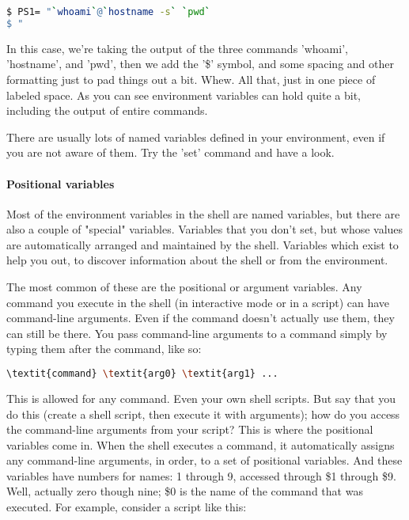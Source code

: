 \lstset{basicstyle=\scriptsize, numbers=left, captionpos=b, tabsize=4}
\begin{lstlisting}[caption=Assigning a combined value to a variable,language={bash},
xleftmargin=15pt,label=lst:Assigningacombinedvaluetoavariable4]
$ PS1= "`whoami`@`hostname -s` `pwd` 
$ "
\end{lstlisting}


In this case, we're taking the output of the three commands 'whoami',
'hostname', and 'pwd', then we add the '\$' symbol, and some spacing and other
formatting just to pad things out a bit. Whew. All that, just in one piece of
labeled space. As you can see environment variables can hold quite a bit,
including the output of entire commands.

There are usually lots of named variables defined in your environment, even if
you are not aware of them. Try the 'set' command and have a look.

\paragraph{Positional variables}
Most of the environment variables in the shell are named variables, but there
are also a couple of "special" variables. Variables that you don't set, but
whose values are automatically arranged and maintained by the shell. Variables
which exist to help you out, to discover information about the shell or from
the environment.

The most common of these are the positional or argument variables. Any command
you execute in the shell (in interactive mode or in a script) can have
command-line arguments. Even if the command doesn't actually use them, they can
still be there. You pass command-line arguments to a command simply by typing
them after the command, like so:

\lstset{basicstyle=\scriptsize, numbers=left, captionpos=b, tabsize=4}
\begin{lstlisting}[language={bash},
xleftmargin=15pt]
\textit{command} \textit{arg0} \textit{arg1} ...
\end{lstlisting}

This is allowed for any command. Even your own shell scripts. But say that you
do this (create a shell script, then execute it with arguments); how do you
access the command-line arguments from your script? This is where the
positional variables come in. When the shell executes a command, it
automatically assigns any command-line arguments, in order, to a set of
positional variables. And these variables have numbers for names: 1 through 9,
accessed through \$1 through \$9. Well, actually zero though nine; \$0 is the
name of the command that was executed. For example, consider a script like
this:

